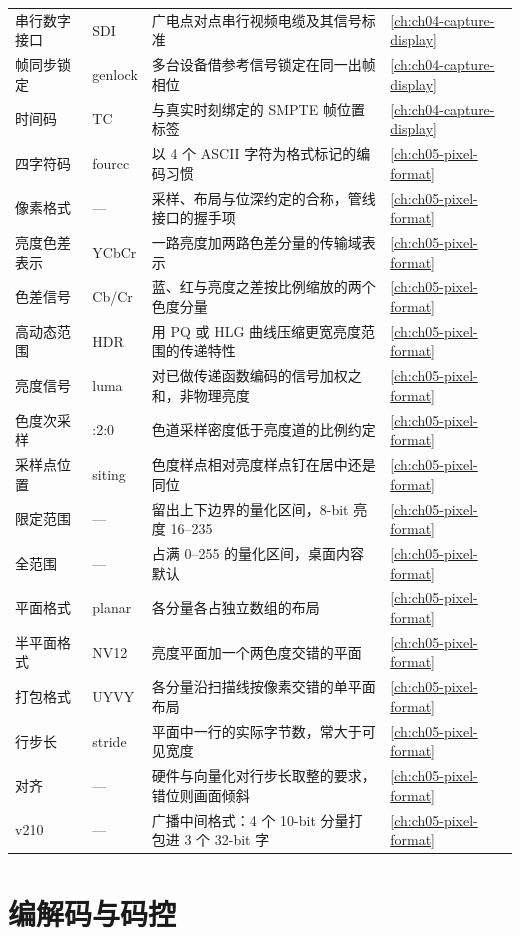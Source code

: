\documentclass[12pt,a4paper,fontset=fandol]{ctexbook}
\begin{document}
\begin{longtable}{>{\raggedright\arraybackslash}p{} >{\raggedright\arraybackslash}p{} >{\raggedright\arraybackslash}p{} >{\raggedright\arraybackslash}p{}}
串行数字接口 & SDI & 广电点对点串行视频电缆及其信号标准 & \ref{ch:ch04-capture-display} \\
帧同步锁定 & genlock & 多台设备借参考信号锁定在同一出帧相位 & \ref{ch:ch04-capture-display} \\
时间码 & TC & 与真实时刻绑定的 SMPTE 帧位置标签 & \ref{ch:ch04-capture-display} \\
四字符码 & fourcc & 以 4 个 ASCII 字符为格式标记的编码习惯 & \ref{ch:ch05-pixel-format} \\
像素格式 & — & 采样、布局与位深约定的合称，管线接口的握手项 & \ref{ch:ch05-pixel-format} \\
亮度色差表示 & YCbCr & 一路亮度加两路色差分量的传输域表示 & \ref{ch:ch05-pixel-format} \\
色差信号 & Cb/Cr & 蓝、红与亮度之差按比例缩放的两个色度分量 & \ref{ch:ch05-pixel-format} \\
高动态范围 & HDR & 用 PQ 或 HLG 曲线压缩更宽亮度范围的传递特性 & \ref{ch:ch05-pixel-format} \\
亮度信号 & luma & 对已做传递函数编码的信号加权之和，非物理亮度 & \ref{ch:ch05-pixel-format} \\
色度次采样 & 4:2:0 & 色道采样密度低于亮度道的比例约定 & \ref{ch:ch05-pixel-format} \\
采样点位置 & siting & 色度样点相对亮度样点钉在居中还是同位 & \ref{ch:ch05-pixel-format} \\
限定范围 & — & 留出上下边界的量化区间，8-bit 亮度 16--235 & \ref{ch:ch05-pixel-format} \\
全范围 & — & 占满 0--255 的量化区间，桌面内容默认 & \ref{ch:ch05-pixel-format} \\
平面格式 & planar & 各分量各占独立数组的布局 & \ref{ch:ch05-pixel-format} \\
半平面格式 & NV12 & 亮度平面加一个两色度交错的平面 & \ref{ch:ch05-pixel-format} \\
打包格式 & UYVY & 各分量沿扫描线按像素交错的单平面布局 & \ref{ch:ch05-pixel-format} \\
行步长 & stride & 平面中一行的实际字节数，常大于可见宽度 & \ref{ch:ch05-pixel-format} \\
对齐 & — & 硬件与向量化对行步长取整的要求，错位则画面倾斜 & \ref{ch:ch05-pixel-format} \\
v210 & — & 广播中间格式：4 个 10-bit 分量打包进 3 个 32-bit 字 & \ref{ch:ch05-pixel-format} \\
\end{longtable}

\section{编解码与码控}
\end{document}
